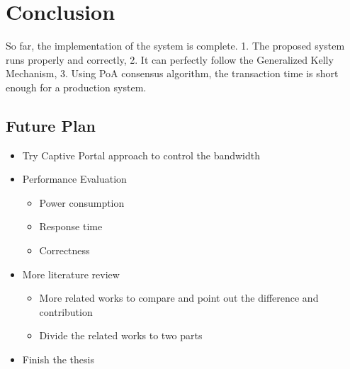 \chapter*{Conclusion}
\label{chp:conclusion}

So far, the implementation of the system is complete. 1. The proposed system runs properly and correctly, 2. It can perfectly follow the Generalized Kelly Mechanism, 3. Using PoA consensus algorithm, the transaction time is short enough for a production system.

\section{Future Plan}

\begin{itemize}
\item Try Captive Portal approach to control the bandwidth
\item Performance Evaluation
    \begin{itemize}
      \item Power consumption
      \item Response time
      \item Correctness
    \end{itemize}
\item More literature review
    \begin{itemize}
        \item More related works to compare and point out the difference and contribution
        \item Divide the related works to two parts
    \end{itemize}{}
\item Finish the thesis
\end{itemize}